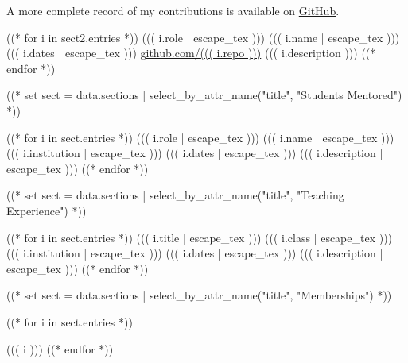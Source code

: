 \documentclass[10pt, letterpaper]{awesome-cv}
\begin{document}
A more complete record of my contributions is available on 
\href{https://github.com/((( data.preamble.contact.github )))}
     {GitHub}.
\begin{cventries}
((* for i in sect2.entries *))
\cventry
  {((( i.role | escape_tex )))}
  {((( i.name | escape_tex )))}
  {((( i.dates | escape_tex )))}
  {\href{https://github.com/((( i.repo )))}{github.com/((( i.repo )))}}
  {((( i.description )))}
((* endfor *))
\end{cventries}

((* set sect = data.sections | select_by_attr_name("title", "Students Mentored") *))
\begin{cventries}
((* for i in sect.entries *))
\cventry
  {((( i.role | escape_tex )))}
  {((( i.name | escape_tex )))}
  {((( i.institution | escape_tex )))}
  {((( i.dates | escape_tex )))}
  {((( i.description | escape_tex )))}
((* endfor *))
\end{cventries}
((* set sect = data.sections | select_by_attr_name("title", "Teaching Experience") *))
\begin{cventries}
((* for i in sect.entries *))
\cventry
  {((( i.title | escape_tex )))}
  {((( i.class | escape_tex )))}
  {((( i.institution | escape_tex )))}
  {((( i.dates | escape_tex )))}
  {((( i.description | escape_tex )))}
((* endfor *))
\end{cventries}

((* set sect = data.sections | select_by_attr_name("title", "Memberships") *))
\begin{cventries}
\begin{cvitems}
  ((* for i in sect.entries *))
  \item{((( i )))}
  ((* endfor *))
\end{cvitems}
\vspace{1em}
\end{cventries}

\end{document}
